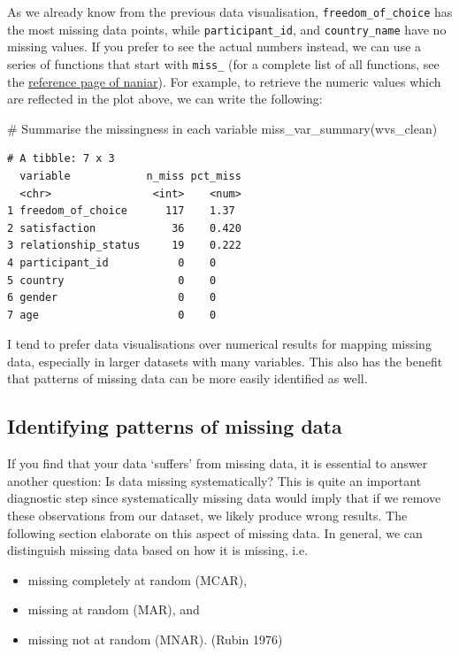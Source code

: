 \documentclass[
  letterpaper,
  DIV=11,
  numbers=noendperiod]{scrreprt}
\newenvironment{Shaded}{\begin{snugshade}}{\end{snugshade}}
\newcommand{\CommentTok}[1]{\textcolor[rgb]{0.37,0.37,0.37}{#1}}
\newcommand{\FunctionTok}[1]{\textcolor[rgb]{0.28,0.35,0.67}{#1}}
\newcommand{\NormalTok}[1]{\textcolor[rgb]{0.00,0.23,0.31}{#1}}
\begin{document}
As we already know from the previous data visualisation,
\texttt{freedom\_of\_choice} has the most missing data points, while
\texttt{participant\_id}, and \texttt{country\_name} have no missing
values. If you prefer to see the actual numbers instead, we can use a
series of functions that start with \texttt{miss\_} (for a complete list
of all functions, see the
\href{https://naniar.njtierney.com/reference/index.html}{reference page
of naniar}). For example, to retrieve the numeric values which are
reflected in the plot above, we can write the following:

\begin{Shaded}
\begin{Highlighting}[]
\CommentTok{\# Summarise the missingness in each variable}
\FunctionTok{miss\_var\_summary}\NormalTok{(wvs\_clean)}
\end{Highlighting}
\end{Shaded}

\begin{verbatim}
# A tibble: 7 x 3
  variable            n_miss pct_miss
  <chr>                <int>    <num>
1 freedom_of_choice      117    1.37 
2 satisfaction            36    0.420
3 relationship_status     19    0.222
4 participant_id           0    0    
5 country                  0    0    
6 gender                   0    0    
7 age                      0    0    
\end{verbatim}

I tend to prefer data visualisations over numerical results for mapping
missing data, especially in larger datasets with many variables. This
also has the benefit that patterns of missing data can be more easily
identified as well.

\subsection{Identifying patterns of missing
data}\label{sec-patterns-of-missing-data}

If you find that your data `suffers' from missing data, it is essential
to answer another question: Is data missing systematically? This is
quite an important diagnostic step since systematically missing data
would imply that if we remove these observations from our dataset, we
likely produce wrong results. The following section elaborate on this
aspect of missing data. In general, we can distinguish missing data
based on how it is missing, i.e.

\begin{itemize}
\item
  missing completely at random (MCAR),
\item
  missing at random (MAR), and
\item
  missing not at random (MNAR). (Rubin 1976)
\end{itemize}
\end{document}
